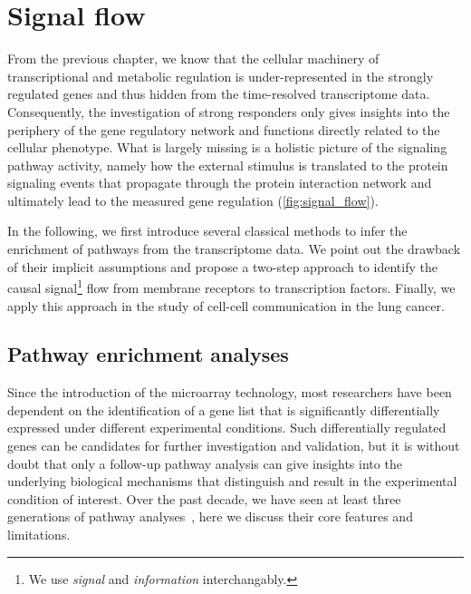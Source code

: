 \chapter{Signal flow}
\label{chap:flow}

From the previous chapter, we know that the cellular machinery of 
transcriptional and metabolic regulation is under-represented in the strongly 
regulated genes and thus hidden from the time-resolved transcriptome data. 
Consequently, the investigation of strong responders only gives insights into
the periphery of the gene regulatory network and functions directly related
to the cellular phenotype. What is largely missing is a holistic picture of
the signaling pathway activity, namely how the external stimulus is translated
to the protein signaling events that propagate through the protein interaction
network and ultimately lead to the measured gene regulation (\ref{fig:signal_flow}).

In the following, we first introduce several classical methods to infer the
enrichment of pathways from the transcriptome data. We point out the drawback
of their implicit assumptions and propose a two-step approach to identify the
causal signal\footnote{We use \emph{signal} and \emph{information} interchangably.} 
flow from membrane receptors to transcription factors. Finally,
we apply this approach in the study of cell-cell communication in the lung
cancer.

\section{Pathway enrichment analyses}
Since the introduction of the microarray technology, 
most researchers have been dependent on the identification
of a gene list that is significantly differentially expressed
under different experimental conditions.
Such differentially regulated genes can be candidates for 
further investigation and validation, but it is without
doubt that only a follow-up
pathway analysis can give insights into the underlying 
biological mechanisms that distinguish and result in 
the experimental condition of interest. Over the past decade, we have seen at least 
three generations of pathway analyses~\citep{Khatri2012}, here we discuss 
their core features and limitations.

